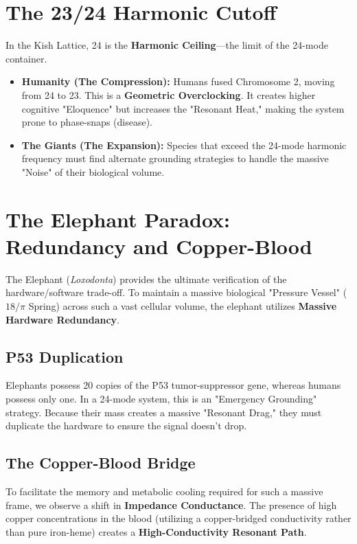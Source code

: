 \documentclass[11pt, letterpaper, openany]{book}
\begin{document}
\section{The 23/24 Harmonic Cutoff}
In the Kish Lattice, 24 is the \textbf{Harmonic Ceiling}—the limit of the 24-mode container.
\begin{itemize}
    \item \textbf{Humanity (The Compression):} Humans fused Chromosome 2, moving from 24 to 23. This is a \textbf{Geometric Overclocking}. It creates higher cognitive "Eloquence" but increases the "Resonant Heat," making the system prone to phase-snaps (disease).
    \item \textbf{The Giants (The Expansion):} Species that exceed the 24-mode harmonic frequency must find alternate grounding strategies to handle the massive "Noise" of their biological volume.
\end{itemize}

\section{The Elephant Paradox: Redundancy and Copper-Blood}

The Elephant (\textit{Loxodonta}) provides the ultimate verification of the hardware/software trade-off. To maintain a massive biological "Pressure Vessel" ($18/\pi$ Spring) across such a vast cellular volume, the elephant utilizes \textbf{Massive Hardware Redundancy}.

\subsection{P53 Duplication}
Elephants possess 20 copies of the P53 tumor-suppressor gene, whereas humans possess only one. In a 24-mode system, this is an "Emergency Grounding" strategy. Because their mass creates a massive "Resonant Drag," they must duplicate the hardware to ensure the signal doesn't drop.

\subsection{The Copper-Blood Bridge}

To facilitate the memory and metabolic cooling required for such a massive frame, we observe a shift in \textbf{Impedance Conductance}. The presence of high copper concentrations in the blood (utilizing a copper-bridged conductivity rather than pure iron-heme) creates a \textbf{High-Conductivity Resonant Path}. 
\end{document}
